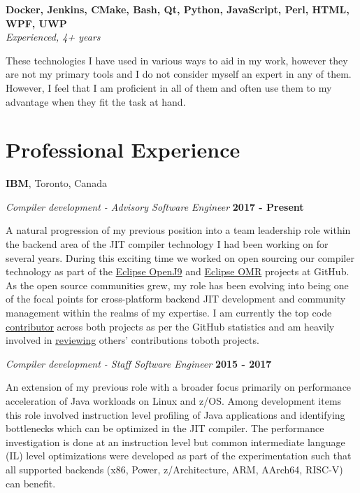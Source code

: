 \documentclass[margin,line]{res}
\begin{document}
\begin{resume}
{\bf Docker, Jenkins, CMake, Bash, Qt, Python, JavaScript, Perl, HTML, WPF, UWP } \\
{\em Experienced, 4+ years}

These technologies I have used in various ways to aid in my work, however they are not my primary tools and I do not
consider myself an expert in any of them. However, I feel that I am proficient in all of them and often use them to my
advantage when they fit the task at hand.

\section{\sc Professional Experience}
{\bf IBM}, Toronto, Canada

{\em Compiler development - Advisory Software Engineer} \hfill {\bf 2017 - Present}
\vspace{-.12in}

A natural progression of my previous position into a team leadership role within the backend area of the JIT compiler 
technology I had been working on for several years. During this exciting time we worked on open sourcing our compiler
technology as part of the \href{https://github.com/eclipse/openj9}{Eclipse OpenJ9} and 
\href{https://github.com/eclipse/omr}{Eclipse OMR} projects at GitHub. As the open source communities grew, my role has
been evolving into being one of the focal points for cross-platform backend JIT development and community management
within the realms of my expertise. I am currently the top code \href{https://github.com/eclipse/omr/graphs/contributors}
{contributor} across both projects as per the GitHub statistics and am heavily involved in 
\href{https://github.com/eclipse/omr/pulls?q=is%3Apr+sort%3Aupdated-desc+reviewed-by%3Afjeremic+is%3Aclosed+}{reviewing} 
others' contributions toboth projects.

{\em Compiler development - Staff Software Engineer} \hfill {\bf 2015 - 2017}
\vspace{-.12in}

An extension of my previous role with a broader focus primarily on performance acceleration of Java workloads on Linux
and z/OS. Among development items this role involved instruction level profiling of Java applications and identifying
bottlenecks which can be optimized in the JIT compiler. The performance investigation is done at an instruction level
but common intermediate language (IL) level optimizations were developed as part of the experimentation such that all
supported backends (x86, Power, z/Architecture, ARM, AArch64, RISC-V) can benefit.


\end{resume}
\end{document}
